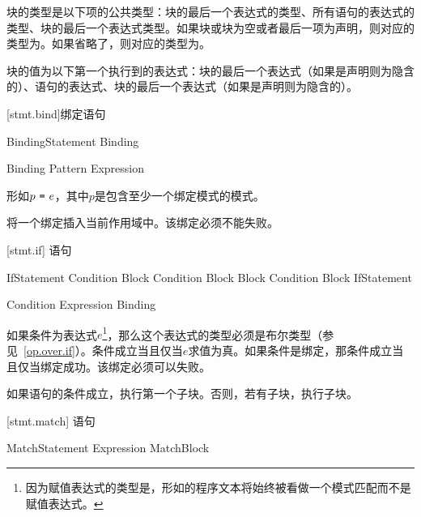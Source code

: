 \pnum
块的类型是以下项的公共类型：块的最后一个表达式的类型、所有语句的表达式的类型、块的最后一个表达式类型。如果块或块为空或者最后一项为声明，则对应的类型为。如果省略了，则对应的类型为。

\pnum
块的值为以下第一个执行到的表达式：块的最后一个表达式（如果是声明则为隐含的\tcode{()}）、语句的表达式、块的最后一个表达式（如果是声明则为隐含的\tcode{()}）。

[stmt.bind]{绑定语句}

\begin{bnf}{BindingStatement}
    Binding \terminal{;}
\end{bnf}

\begin{bnf}{Binding}
    Pattern \terminal{=} Expression \terminal{;}
\end{bnf}

\pnum
{}形如$p\ \tcode{=}\ e$，其中$p$是包含至少一个绑定模式的模式。

\pnum
{}将一个绑定插入当前作用域中。该绑定必须不能失败。

[stmt.if]{ 语句}

\begin{bnf}{IfStatement}
     Condition Block \br
     Condition Block  Block \br
     Condition Block  IfStatement
\end{bnf}

\begin{bnf}{Condition}
    Expression \br
    Binding
\end{bnf}

\pnum
如果条件为表达式$e$\footnote{因为赋值表达式的类型是，形如的程序文本将始终被看做一个模式匹配而不是赋值表达式。}，那么这个表达式的类型必须是布尔类型（参见~\ref{op.over.if}）。条件成立当且仅当$e$求值为真。如果条件是绑定，那条件成立当且仅当绑定成功。该绑定必须可以失败。

\pnum
如果语句的条件成立，执行第一个子块。否则，若有子块，执行子块。

[stmt.match]{ 语句}

\begin{bnf}{MatchStatement}
     Expression MatchBlock
\end{bnf}

